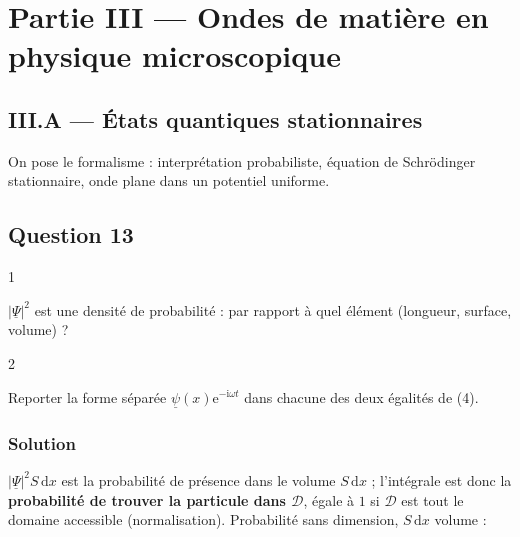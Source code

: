 \documentclass[11pt,a4paper]{article}
\newcommand{\equationajustee}[1]{%
  \sbox{\boiteequation}{$\displaystyle #1$}%
  \ifdim\wd\boiteequation>\linewidth
    \[\resizebox{\linewidth}{!}{\usebox{\boiteequation}}\]%
  \else
    \[#1\]%
  \fi}
\begin{document}
\hypertarget{partie-iii-ondes-de-matiuxe8re-en-physique-microscopique}{%
\section{Partie III --- Ondes de matière en physique microscopique}\label{partie-iii-ondes-de-matiuxe8re-en-physique-microscopique}}

\hypertarget{iii.a-uxe9tats-quantiques-stationnaires}{%
\subsection{III.A --- États quantiques stationnaires}\label{iii.a-uxe9tats-quantiques-stationnaires}}

On pose le formalisme : interprétation probabiliste, équation de Schrödinger stationnaire, onde plane dans un potentiel uniforme.

\hypertarget{question-13}{%
\subsection{Question 13}\label{question-13}}

\begin{indication}{1}

\(|\underline\Psi|^2\) est une densité de probabilité : par rapport à quel élément (longueur, surface, volume) ?

\end{indication}

\begin{indication}{2}

Reporter la forme séparée \(\underline\psi(x)\mathrm e^{-\mathrm i\omega t}\) dans chacune des deux égalités de (4).

\end{indication}

\hypertarget{solution-12}{%
\subsubsection{Solution}\label{solution-12}}

\(|\underline\Psi|^2S\,\mathrm dx\) est la probabilité de présence dans le volume \(S\,\mathrm dx\) ; l'intégrale est donc la \textbf{probabilité de trouver la particule dans \(\mathscr D\)}, égale à \(1\) si \(\mathscr D\) est tout le domaine accessible (normalisation). Probabilité sans dimension, \(S\,\mathrm dx\) volume :

\equationajustee{\boxed{[\underline\Psi]=L^{-3/2}}}
\end{document}
